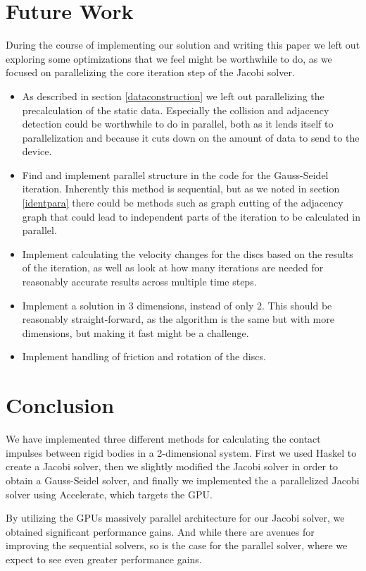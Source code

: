 \documentclass[runningheads,a4paper]{llncs}
\begin{document}
\section{Future Work}
During the course of implementing our solution and writing this
paper we left out exploring some optimizations that we feel
might be worthwhile to do, as we focused on parallelizing
the core iteration step of the Jacobi solver.

\begin{itemize}
\item As described in section \ref{dataconstruction} we left out
  parallelizing the precalculation of the static data.
  Especially the collision and adjacency detection could be worthwhile
  to do in parallel, both as it lends itself to parallelization
  and because it cuts down on the amount of data to send to the device.
\item Find and implement parallel structure in the code for the Gauss-Seidel iteration.
  Inherently this method is sequential, but as we noted in section \ref{identpara}
  there could be methods such as graph cutting of the adjacency graph
  that could lead to independent parts of the iteration to be calculated in parallel.
\item Implement calculating the velocity changes for the discs based
  on the results of the iteration, as well as look at how many iterations are needed
  for reasonably accurate results across multiple time steps.
\item Implement a solution in 3 dimensions, instead of only 2.
  This should be reasonably straight-forward, as the algorithm is the same
  but with more dimensions, but making it fast might be a challenge.
\item Implement handling of friction and rotation of the discs.
\end{itemize}

\section{Conclusion}

We have implemented three different methods for calculating the contact
impulses between rigid bodies in a 2-dimensional system. First we used Haskel
to create a Jacobi solver, then we slightly modified the Jacobi solver in order
to obtain a Gauss-Seidel solver, and finally we implemented the a parallelized
Jacobi solver using Accelerate, which targets the GPU.

By utilizing the GPUs massively parallel architecture for our Jacobi solver, we
obtained significant performance gains. And while there are avenues
for improving the sequential solvers, so is the case for the parallel solver,
where we expect to see even greater performance gains.
\end{document}
